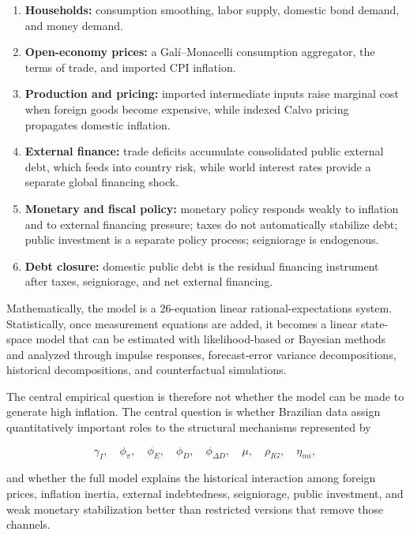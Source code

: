 \begin{enumerate}
    \item \textbf{Households:} consumption smoothing, labor supply, domestic
    bond demand, and money demand.

    \item \textbf{Open-economy prices:} a Gal\'i--Monacelli consumption
    aggregator, the terms of trade, and imported CPI inflation.

    \item \textbf{Production and pricing:} imported intermediate inputs raise
    marginal cost when foreign goods become expensive, while indexed Calvo
    pricing propagates domestic inflation.

    \item \textbf{External finance:} trade deficits accumulate consolidated
    public external debt, which feeds into country risk, while world interest
    rates provide a separate global financing shock.

    \item \textbf{Monetary and fiscal policy:} monetary policy responds weakly
    to inflation and to external financing pressure; taxes do not
    automatically stabilize debt; public investment is a separate policy
    process; seigniorage is endogenous.

    \item \textbf{Debt closure:} domestic public debt is the residual financing
    instrument after taxes, seigniorage, and net external financing.
\end{enumerate}

Mathematically, the model is a 26-equation linear rational-expectations system.
Statistically, once measurement equations are added, it becomes a linear
state-space model that can be estimated with likelihood-based or Bayesian
methods and analyzed through impulse responses, forecast-error variance
decompositions, historical decompositions, and counterfactual simulations.

The central empirical question is therefore not whether the model can be made
to generate high inflation. The central question is whether Brazilian data
assign quantitatively important roles to the structural mechanisms represented
by

\[
\gamma_I,\quad
\phi_\pi,\quad
\phi_E,\quad
\phi_D,\quad
\phi_{\Delta D},\quad
\mu,\quad
\rho_{IG},\quad
\eta_{mi},
\]

and whether the full model explains the historical interaction among foreign
prices, inflation inertia, external indebtedness, seigniorage, public
investment, and weak monetary stabilization better than restricted versions
that remove those channels.
